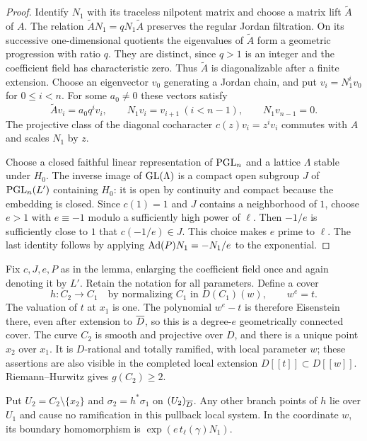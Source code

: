 \begin{proof}
Identify $N_1$ with its traceless nilpotent matrix and choose a matrix
lift $\widetilde A$ of $A$.  The relation
$\widetilde A N_1=qN_1\widetilde A$ preserves the regular Jordan
filtration.  On its successive one-dimensional quotients the
eigenvalues of $\widetilde A$ form a geometric progression with ratio
$q$.  They are distinct, since $q>1$ is an integer and the coefficient
field has characteristic zero.  Thus $\widetilde A$ is diagonalizable
after a finite extension.  Choose an eigenvector $v_0$ generating a
Jordan chain, and put $v_i=N_1^iv_0$ for $0\leq i<n$.  For some
$a_0\ne0$ these vectors satisfy
\[
 \widetilde A v_i=a_0q^i v_i,
 \qquad N_1v_i=v_{i+1}\ (i<n-1),\qquad N_1v_{n-1}=0.
\]
The projective class of the diagonal cocharacter
$c(z)v_i=z^iv_i$ commutes with $A$ and scales $N_1$ by $z$.

Choose a closed faithful linear representation of $\mathrm{PGL}_n$ and a
lattice $\Lambda$ stable under $H_0$.  The inverse image of
$\mathrm{GL}(\Lambda)$ is a compact open subgroup $J$ of $\mathrm{PGL}_n(L')$
containing $H_0$: it is open by continuity and compact because the
embedding is closed.  Since $c(1)=1$ and $J$ contains a neighborhood
of $1$, choose $e>1$ with $e\equiv-1$ modulo a sufficiently high
power of $\ell$.  Then $-1/e$ is sufficiently close to $1$ that
$c(-1/e)\in J$.  This choice makes $e$ prime to $\ell$.
The last identity follows by applying
$\operatorname{Ad}(P)N_1=-N_1/e$ to the exponential.
\end{proof}

Fix $c,J,e,P$ as in the lemma, enlarging the coefficient field once
and again denoting it by $L'$.  Retain the notation for all parameters.
Define a cover
\begin{equation}\label{eq:auxiliary-cover}
 h:C_2\longrightarrow C_1
 \quad\text{by normalizing }C_1\text{ in }D(C_1)(w),
 \qquad w^e=t.
\end{equation}
The valuation of $t$ at $x_1$ is one.  The polynomial $w^e-t$ is
therefore Eisenstein there, even after extension to $\overline D$, so this
is a degree-$e$ geometrically connected cover.  The curve $C_2$ is
smooth and projective over $D$, and there is a unique point $x_2$
over $x_1$.  It is $D$-rational and totally ramified, with local
parameter $w$; these assertions are also visible in the completed
local extension $D[[t]]\subset D[[w]]$.  Riemann--Hurwitz gives
$g(C_2)\geq2$.

Put $U_2=C_2\setminus\{x_2\}$ and
$\sigma_2=h^*\sigma_1$ on $(U_2)_{\overline D}$.  Any other branch points
of $h$ lie over $U_1$ and cause no ramification in this pullback
local system.  In the coordinate $w$, its boundary homomorphism is
$\exp(e\,t_\ell(\gamma)N_1)$.

